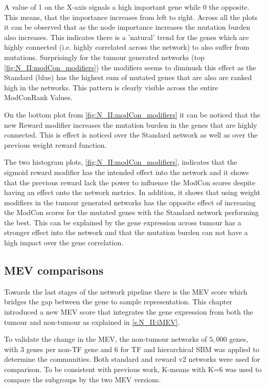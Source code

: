 A value of 1 on the X-axis signals a high important gene while 0 the opposite. This means, that the importance increases from left to right. Across all the plots it can be observed that as the node importance increases the mutation burden also increases. This indicates there is a 'natural' trend for the genes which are highly connected (i.e. highly correlated across the network) to also suffer from mutations. Surprisingly for the tumour generated networks (top \cref{fig:N_II:modCon_modifiers}) the modifiers seems to diminush this effect as the Standard (blue) has the highest sum of mutated genes that are also are ranked high in the networks. This pattern is clearly visible across the entire ModConRank Values.

On the bottom plot from \cref{fig:N_II:modCon_modifiers} it can be noticed that the new Reward modifier increases the mutation burden in the genes that are highly connected. This is effect is noticed over the Standard network as well as over the previous weight reward function. 

The two histogram plots, \cref{fig:N_II:modCon_modifiers}, indicates that the sigmoid reward modifier has the intended effect into the network and it shows that the previous reward lack the power to influence the ModCon scores despite having an effect onto the network metrics. In addition, it shows that using weight modifiers in the tumour generated networks has the opposite effect of increasing the ModCon scores for the mutated genes with the Standard network performing the best. This can be explained by the gene expression across tumour has a stronger effect into the network and that the mutation burden can not have a high impact over the gene correlation.


\subsection{MEV comparisons} \label{s:N_II:mev_comp}

Towards the last stages of the network pipeline there is the MEV score which bridges the gap between the gene to sample representation. This chapter introduced a new MEV score that integrates the gene expression from both the tumour and non-tumour as explained in \cref{s:N_II:iMEV}.

To validate the change in the MEV, the non-tumour networks of $5,000$ genes, with $3$ genes per non-TF gene and $6$ for TF and hierarchical SBM was applied to determine the communities. Both standard and reward v2 networks were used for comparison. To be consistent with previous work, K-means with K=6 was used to compare the subgroups by the two MEV versions.

